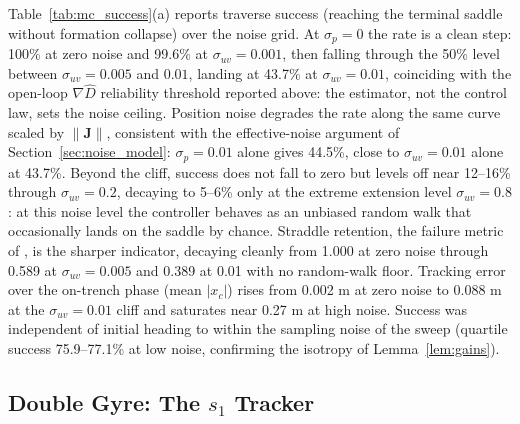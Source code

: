 \documentclass[lettersize,journal]{IEEEtran}
\begin{document}
Table~\ref{tab:mc_success}(a) reports traverse success (reaching the
terminal saddle without formation collapse) over the noise grid. At
$\sigma_p = 0$ the rate is a clean step: 100\% at zero noise and
99.6\% at $\sigma_{uv} = 0.001$, then falling through the 50\% level between
$\sigma_{uv} = 0.005$ and $0.01$, landing at 43.7\% at
$\sigma_{uv} = 0.01$, coinciding with the open-loop $\nabla\hat{D}$
reliability threshold reported above: the estimator, not the control
law, sets the noise ceiling. Position noise degrades the rate along the same curve scaled
by $\|\mathbf{J}\|$, consistent with the effective-noise argument of
Section~\ref{sec:noise_model}: $\sigma_p = 0.01$ alone gives 44.5\%,
close to $\sigma_{uv} = 0.01$ alone at 43.7\%. Beyond the cliff, success
does not fall to zero but levels off near 12--16\% through
$\sigma_{uv} = 0.2$, decaying to 5--6\% only at the extreme extension
level $\sigma_{uv} = 0.8$: at this noise level
the controller behaves as an unbiased random walk that occasionally
lands on the saddle by chance. Straddle retention, the failure metric
of \cite{9}, is the sharper indicator, decaying cleanly from 1.000 at
zero noise through 0.589 at $\sigma_{uv} = 0.005$ and 0.389 at 0.01
with no random-walk floor. Tracking
error over the on-trench phase (mean $|x_c|$) rises from 0.002 m at zero
noise to 0.088 m at the $\sigma_{uv} = 0.01$ cliff and saturates near
0.27 m at high noise. Success was independent of initial heading to
within the sampling noise of the sweep (quartile success 75.9--77.1\%
at low noise, confirming the isotropy of Lemma~\ref{lem:gains}).

\subsection{Double Gyre: The $s_1$ Tracker}
\label{sec:results_oecs}

\end{document}
